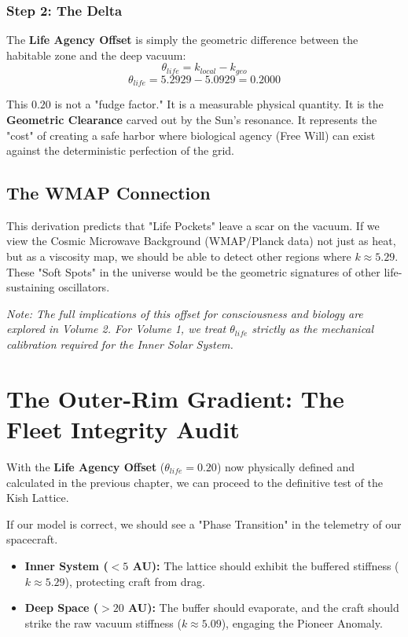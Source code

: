 \documentclass[11pt, letterpaper, openany]{book}
\begin{document}
\subsection{Step 2: The Delta}
The \textbf{Life Agency Offset} is simply the geometric difference between the habitable zone and the deep vacuum:
\begin{equation}
    \theta_{life} = k_{local} - k_{geo}
\end{equation}
\begin{equation}
    \theta_{life} = 5.2929 - 5.0929 = \mathbf{0.2000}
\end{equation}

This $0.20$ is not a "fudge factor." It is a measurable physical quantity. It is the \textbf{Geometric Clearance} carved out by the Sun's resonance. It represents the "cost" of creating a safe harbor where biological agency (Free Will) can exist against the deterministic perfection of the grid.

\section{The WMAP Connection}
This derivation predicts that "Life Pockets" leave a scar on the vacuum. 
If we view the Cosmic Microwave Background (WMAP/Planck data) not just as heat, but as a viscosity map, we should be able to detect other regions where $k \approx 5.29$. 
These "Soft Spots" in the universe would be the geometric signatures of other life-sustaining oscillators.

\textit{Note: The full implications of this offset for consciousness and biology are explored in Volume 2. For Volume 1, we treat $\theta_{life}$ strictly as the mechanical calibration required for the Inner Solar System.}
\chapter{The Outer-Rim Gradient: The Fleet Integrity Audit}
\label{ch:fleet_audit}

With the \textbf{Life Agency Offset} ($\theta_{life} = 0.20$) now physically defined and calculated in the previous chapter, we can proceed to the definitive test of the Kish Lattice.

If our model is correct, we should see a "Phase Transition" in the telemetry of our spacecraft.
\begin{itemize}
    \item \textbf{Inner System ($< 5$ AU):} The lattice should exhibit the buffered stiffness ($k \approx 5.29$), protecting craft from drag.
    \item \textbf{Deep Space ($> 20$ AU):} The buffer should evaporate, and the craft should strike the raw vacuum stiffness ($k \approx 5.09$), engaging the Pioneer Anomaly.
\end{itemize}
\end{document}
